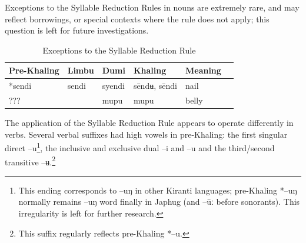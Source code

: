 \documentclass[oldfontcommands,oneside,a4paper,11pt]{article}
\newcommand{\ipa}[1]{{\phon \mbox{#1}}} %
\begin{document}
Exceptions to the Syllable Reduction Rules in nouns are extremely rare, and may reflect borrowings, or special contexts where the rule does not apply; this question is left for future investigations.

\begin{table}[H]
\caption{Exceptions to the Syllable Reduction Rule} \centering \label{tab:non.reduction}
\begin{tabular}{llllll}
\toprule
Pre-Khaling	&Limbu	&Dumi	&Khaling	&Meaning\\
\midrule
\ipa{*sendi}			&\ipa{sendi}&	\ipa{syendi}	&	\ipa{sēndʉ}, \ipa{sēndi}	&	nail \\
 	???& &	\ipa{mupu}	&	  \ipa{mupu}	&	belly \\
\bottomrule
\end{tabular}
\end{table}

The application of the Syllable Reduction Rule appears to operate differently in verbs. Several verbal suffixes had high vowels in pre-Khaling: the first singular direct \ipa{--u}\footnote{This ending corresponds to \ipa{--uŋ} in other Kiranti languages; pre-Khaling \ipa{*--uŋ} normally remains \ipa{--uŋ} word finally in Japhug (and \ipa{--ūː} before sonorants). This irregularity is left for further research.}, the inclusive and exclusive dual --\ipa{i} and --\ipa{u} and the third/second transitive \ipa{--ʉ}.\footnote{This suffix regularly reflects pre-Khaling \ipa{*--u}.}
\end{document}
